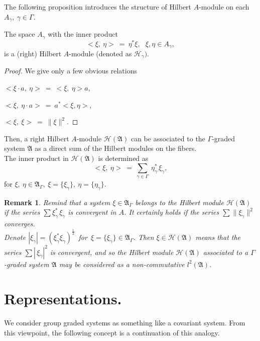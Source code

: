 \documentclass[
11pt,%
tightenlines,%
twoside,%
onecolumn,%
nofloats,%
nobibnotes,%
nofootinbib,%
superscriptaddress,%
noshowpacs,%
centertags]%
{revtex4}
\newtheorem{remark}{Remark} %
\begin{document}
\noindent The following proposition introduces the structure of  Hilbert  $A$-module on each  $A_\gamma, \ \gamma\in \Gamma$.

\begin{proposition} The space $A_\gamma$ with the inner product
\begin{equation}
\label{Hilbert-module}
< \xi,\ \eta >\ =\ \eta^*\xi,\ \ \ \xi, \eta\in A_\gamma,
\end{equation}
is a (right) Hilbert $A$-module  (denoted as  $\mathcal H_\gamma)$.
\end{proposition}
\begin{proof}
We give only a few obvious relations

\medskip $<\xi\cdot a,\ \eta >\
=\ <\xi,\ \eta >a$,

\medskip $<\xi,\  \eta\cdot a >\
=\ a^* <\xi, \eta >$,

\medskip $<\xi,\ \xi>\ =\ \|\xi\|^2$.
\end{proof}

\noindent Then, a right Hilbert  $A$-module  $\mathcal H(\mathfrak A)$  can be associated to the  $\Gamma$-graded system $\mathfrak A$ as a direct sum of the Hilbert modules on the fibers.\\
The inner product in $\mathcal H(\mathfrak A)$ is determined as
\begin{equation}\label{inner-product}
< \xi,\ \eta >\ =\ \sum\limits_{\gamma\in\Gamma}\ \eta^*_\gamma\, \xi_\gamma,
\end{equation}
for $\xi,\ \eta\in\mathfrak A_\Gamma,\  \xi=\{\xi_\gamma\},\ \eta =\{\eta_\gamma\}$.

\begin{remark} Remind that a system $\xi\in\mathfrak A_\Gamma$   belongs to the Hilbert module $\mathcal H(\mathfrak A)$ if the series $\sum\xi^*_\gamma\, \xi_\gamma$  is convergent in $A$. It certainly holds if the series $\sum\|\xi_\gamma\|^2$  converges.\\
Denote $|\xi_\gamma| = (\xi^*_\gamma\xi_\gamma)^{\frac 12}$\  for\ $\xi = \{\xi_\gamma\}\in\mathfrak A_\Gamma$. Then $\xi\in \mathcal H(\mathfrak A)$ means that the series $\sum|\, \xi_\gamma |^2$  is convergent, and so the Hilbert module $\mathcal H(\mathfrak A)$ associated to a $\Gamma$-graded system $\mathfrak A$  may be considered as a non-commutative $l^2(\mathfrak A)$.
\end{remark}

\section{Representations.}
We consider group graded systems as something like a  covariant system. From this viewpoint, the following concept is a continuation of this analogy.
\end{document}
